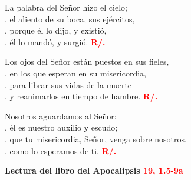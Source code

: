 \documentclass[12pt, letterpaper]{report}
\begin{document}
  \hspace{2cm} La palabra del Se\~nor hizo el cielo;\\
  . \hspace{2.5cm} el aliento de su boca, sus ej\'ercitos,\\
  . \hspace{2.5cm} porque \'el lo dijo, y existi\'o,\\
  . \hspace{2.5cm} \'el lo mand\'o, y surgi\'o. \hspace{1cm} {\bfseries \textcolor{red}{R/.}}

  \hspace{2cm} Los ojos del Se\~nor est\'an puestos en sus fieles,\\
  . \hspace{2.5cm}  en los que esperan en su misericordia,\\
  . \hspace{2.5cm}  para librar sus vidas de la muerte\\
  . \hspace{2.5cm}  y reanimarlos en tiempo de hambre. \hspace{1cm} {\bfseries \textcolor{red}{R/.}}

  \hspace{2cm} Nosotros aguardamos al Se\~nor:\\
  . \hspace{2.5cm}  \'el es nuestro auxilio y escudo;\\
  . \hspace{2.5cm}  que tu misericordia, Se\~nor, venga sobre nosotros,\\
  . \hspace{2.5cm}  como lo esperamos de ti. \hspace{1cm} {\bfseries \textcolor{red}{R/.}}

  \clearpage

  \Large {\bfseries Lectura del libro del Apocalipsis \hspace{1cm} \textcolor{red}{19, 1.5-9a}}
\end{document}
